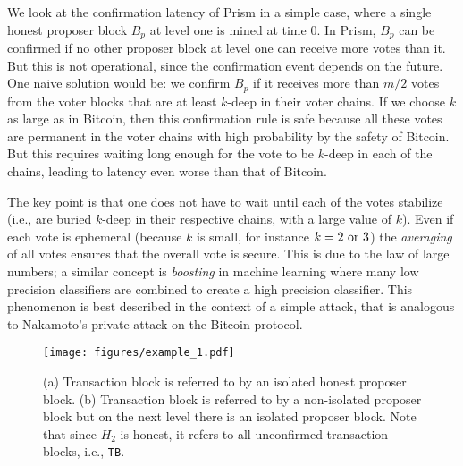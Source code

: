 \documentclass{article}
\newcommand{\pramod}[1]{{\color{red}
\footnotesize[Pramod: #1] }}
\begin{document}
We look at the confirmation latency of {\sf Prism} in a simple case, where a single honest proposer block $B_p$ at level one is mined at time $0$. %
 In {\sf Prism}, $B_p$ can be confirmed if no other proposer block at level one can receive more votes than it. But this is not operational, since the confirmation event depends on the future. One naive solution would be: we confirm $B_p$ if it receives more than $m/2$ votes from the voter blocks that are at least $k$-deep in their voter chains. If we choose $k$ as large as in Bitcoin, then this confirmation rule is safe  because all these votes are permanent in the voter chains with high probability by the safety of Bitcoin. But this requires waiting long enough for the vote to be $k$-deep in each of the chains, leading to latency even worse than that of Bitcoin.  
 
 The key point is that one does not have to wait until each of the votes stabilize (i.e., are buried $k$-deep in their respective chains, with a large value of $k$). Even if each vote is ephemeral (because $k$ is small, for instance $k=2 ~{\rm or}~3$) the {\em averaging} of all votes ensures that the overall vote is secure. This is due to the law of large numbers; a similar concept is {\em boosting} in machine learning where many low precision classifiers are combined to create a high precision classifier. This phenomenon is best described in the context of a simple attack, that is analogous to Nakamoto's private attack on the {\sf Bitcoin} protocol. 
 

\begin{figure}[h]
\begin{centering}
\texttt{[image: figures/example\_1.pdf]}
\caption{(a) Transaction block is referred to by an isolated honest proposer block. (b) Transaction block is referred to by a non-isolated proposer block but on the next level there is an isolated proposer block.
Note that since $H_2$ is honest, it refers to all unconfirmed transaction blocks, i.e., \texttt{TB}.}
\label{fig:example_1}
\end{centering}
\end{figure}
\end{document}

